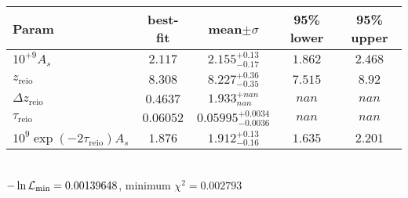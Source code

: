 \begin{tabular}{|l|c|c|c|c|} 
 \hline 
Param & best-fit & mean$\pm\sigma$ & 95\% lower & 95\% upper \\ \hline 
$10^{+9}A_{s }$ &$2.117$ & $2.155_{-0.17}^{+0.13}$ & $1.862$ & $2.468$ \\ 
$z_\mathrm{reio}$ &$8.308$ & $8.227_{-0.35}^{+0.36}$ & $7.515$ & $8.92$ \\ 
$\Delta z_\mathrm{reio}$ &$0.4637$ & $1.933_{nan}^{+nan}$ & $nan$ & $nan$ \\ 
$\tau_\mathrm{reio}$ &$0.06052$ & $0.05995_{-0.0036}^{+0.0034}$ & $nan$ & $nan$ \\ 
$10^9 \exp(-2 \tau_\mathrm{reio}) A_s$ &$1.876$ & $1.912_{-0.16}^{+0.13}$ & $1.635$ & $2.201$ \\ 
\hline 
 \end{tabular} \\ 
$-\ln{\cal L}_\mathrm{min} =0.00139648$, minimum $\chi^2=0.002793$ \\ 
